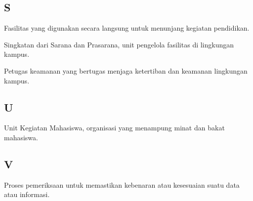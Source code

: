 \subsection*{S}
\begin{description}[leftmargin=3.5cm, style=sameline, font=\normalfont]
    \item[Sarana] Fasilitas yang digunakan secara langsung untuk menunjang kegiatan pendidikan.
    \item[Sarpras] Singkatan dari Sarana dan Prasarana, unit pengelola fasilitas di lingkungan kampus.
    \item[Security] Petugas keamanan yang bertugas menjaga ketertiban dan keamanan lingkungan kampus.
\end{description}

\subsection*{U}
\begin{description}[leftmargin=3.5cm, style=sameline, font=\normalfont]
    \item[UKM] Unit Kegiatan Mahasiswa, organisasi yang menampung minat dan bakat mahasiswa.
\end{description}

\subsection*{V}
\begin{description}[leftmargin=3.5cm, style=sameline, font=\normalfont]
    \item[Verifikasi] Proses pemeriksaan untuk memastikan kebenaran atau kesesuaian suatu data atau informasi.
\end{description}